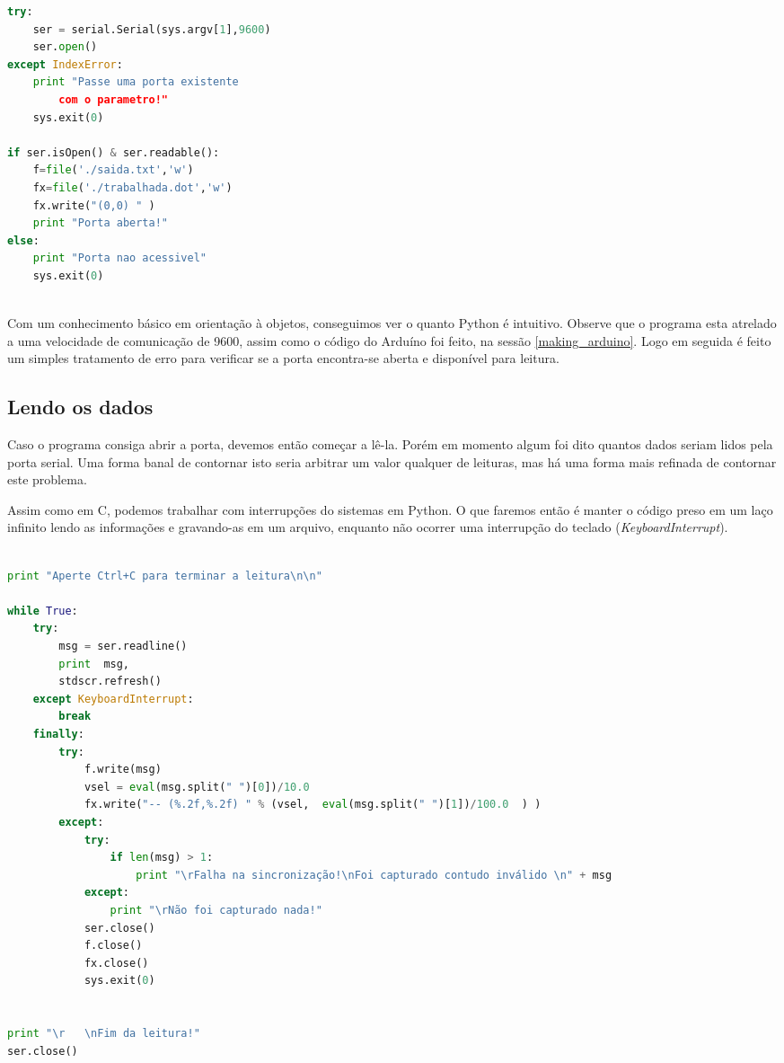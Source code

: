 \begin{multicols}{2}
\begin{lstlisting}[basicstyle=\ttfamily,language=Python,numbers=none,caption={[Acessando a porta serial]Acessando a porta serial}]
try:
	ser = serial.Serial(sys.argv[1],9600)
	ser.open()
except IndexError:
	print "Passe uma porta existente 
		com o parametro!"
	sys.exit(0)

if ser.isOpen() & ser.readable():
	f=file('./saida.txt','w')
	fx=file('./trabalhada.dot','w')
	fx.write("(0,0) " )
	print "Porta aberta!"
else:
	print "Porta nao acessivel"
	sys.exit(0)
	
\end{lstlisting}
Com um conhecimento básico em orientação à objetos, conseguimos ver o quanto Python é intuitivo. Observe que o programa esta atrelado a uma velocidade de comunicação de 9600, assim como o código do Arduíno foi feito, na sessão \ref{making_arduino}. Logo em seguida é feito um simples tratamento de erro para verificar se a porta encontra-se aberta e disponível para leitura.

\subsection{Lendo os dados}\label{reading}


Caso o programa consiga abrir a porta, devemos então começar a lê-la. Porém em momento algum foi dito quantos dados seriam lidos pela porta serial. Uma forma banal de contornar isto seria arbitrar um valor qualquer de leituras, mas há uma forma mais refinada de contornar este problema.

Assim como em C, podemos trabalhar com interrupções do sistemas em Python. O que faremos então é manter o código preso em um laço infinito lendo as informações e gravando-as em um arquivo, enquanto não ocorrer uma interrupção do teclado (\textit{KeyboardInterrupt}).

\begin{lstlisting}[basicstyle=\ttfamily,language=Python,numbers=none,caption={[Lendo dados]Lendo dados ininterruptamente}]

print "Aperte Ctrl+C para terminar a leitura\n\n"

while True:
	try:
		msg = ser.readline()
		print  msg,
		stdscr.refresh()
	except KeyboardInterrupt:
		break	
	finally:
		try:
			f.write(msg)
			vsel = eval(msg.split(" ")[0])/10.0
			fx.write("-- (%.2f,%.2f) " % (vsel,  eval(msg.split(" ")[1])/100.0  ) )
		except:
			try:
				if len(msg) > 1:
					print "\rFalha na sincronização!\nFoi capturado contudo inválido \n" + msg 
			except:
				print "\rNão foi capturado nada!"
			ser.close()
			f.close()
			fx.close()
			sys.exit(0)


print "\r   \nFim da leitura!"
ser.close()


\end{lstlisting}
\end{multicols}
